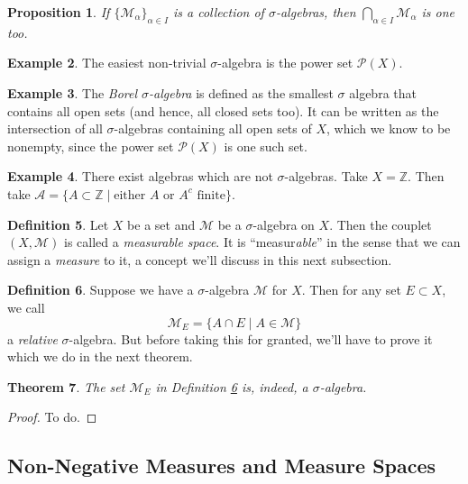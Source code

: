 \documentclass[12pt]{article}
\theoremstyle{plain}
\newtheorem{thm}{Theorem}[subsection]
\newtheorem{prop}[thm]{Proposition}
\theoremstyle{definition}
\newtheorem{defn}[thm]{Definition}
\newtheorem{ex}[thm]{Example}
\theoremstyle{remark}
\begin{document}
\begin{prop}
If $\{\mathscr{M}_\alpha\}_{\alpha\in I}$ is a collection of $\sigma$-algebras, then $\bigcap_{\alpha\in I} \mathscr{M}_\alpha$ is one too.
\end{prop}

\begin{ex}
The easiest non-trivial $\sigma$-algebra is the power set $\mathscr{P}(X)$.
\end{ex}

\begin{ex}
The \emph{Borel $\sigma$-algebra} is defined as the smallest $\sigma$ algebra that contains all open sets (and hence, all closed sets too). It can be written as the intersection of all $\sigma$-algebras containing all open sets of $X$, which we know to be nonempty, since the power set $\mathscr{P}(X)$ is one such set.
\end{ex}

\begin{ex}
There exist algebras which are not $\sigma$-algebras. Take $X=\mathbb{Z}$. Then take $\mathscr{A} = \{A\subset \mathbb{Z} \; |\; \text{either $A$ or $A^c$ finite}\}$. 
\end{ex}

\begin{defn} 
Let $X$ be a set and $\mathscr{M}$ be a $\sigma$-algebra on $X$. Then the couplet $(X, \mathscr{M})$ is called a \emph{measurable space}. It is ``measur\emph{able}'' in the sense that we can assign a \emph{measure} to it, a concept we'll discuss in this next subsection.
\end{defn}

\begin{defn}
\label{relsigal}
Suppose we have a $\sigma$-algebra $\mathscr{M}$ for $X$. Then for any set $E\subset X$, we call
\[
    \mathscr{M}_E = \{ A \cap E \; | \; A \in \mathscr{M}\}
\]
a \emph{relative} $\sigma$-algebra. But before taking this for granted, we'll have to prove it which we do in the next theorem.
\end{defn}

\begin{thm}
\label{relsigal.thm}
The set $\mathscr{M}_E$ in Definition \ref{relsigal} is, indeed, a $\sigma$-algebra.
\end{thm}
\begin{proof}
To do.
\end{proof}





\subsection{Non-Negative Measures and Measure Spaces}
\end{document}
